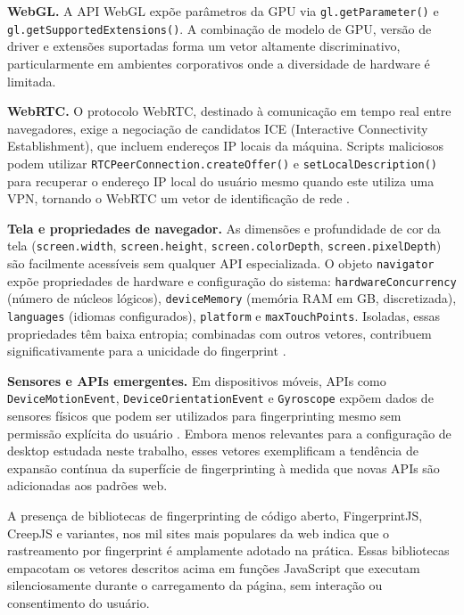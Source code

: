 \textbf{WebGL.} A API WebGL expõe parâmetros da GPU via
\texttt{gl.getParameter()} e \texttt{gl.getSupportedExtensions()}. A combinação de
modelo de GPU, versão de driver e extensões suportadas forma um vetor altamente
discriminativo, particularmente em ambientes corporativos onde a diversidade de
hardware é limitada.

\textbf{WebRTC.} O protocolo WebRTC, destinado à comunicação em tempo real entre
navegadores, exige a negociação de candidatos ICE (Interactive Connectivity
Establishment), que incluem endereços IP locais da máquina. Scripts maliciosos
podem utilizar \texttt{RTCPeerConnection.createOffer()} e
\texttt{setLocalDescription()} para recuperar o endereço IP local do usuário mesmo
quando este utiliza uma VPN, tornando o WebRTC um vetor de identificação de rede
\cite{reiter2017}.

\textbf{Tela e propriedades de navegador.} As dimensões e profundidade de cor da
tela (\texttt{screen.width}, \texttt{screen.height}, \texttt{screen.colorDepth},
\texttt{screen.pixelDepth}) são facilmente acessíveis sem qualquer API
especializada. O objeto \texttt{navigator} expõe propriedades de hardware e
configuração do sistema: \texttt{hardwareConcurrency} (número de núcleos lógicos),
\texttt{deviceMemory} (memória RAM em GB, discretizada), \texttt{languages}
(idiomas configurados), \texttt{platform} e \texttt{maxTouchPoints}. Isoladas,
essas propriedades têm baixa entropia; combinadas com outros vetores, contribuem
significativamente para a unicidade do fingerprint \cite{laperdrix2016}.

\textbf{Sensores e APIs emergentes.} Em dispositivos móveis, APIs como
\texttt{DeviceMotionEvent}, \texttt{DeviceOrientationEvent} e \texttt{Gyroscope}
expõem dados de sensores físicos que podem ser utilizados para
fingerprinting mesmo sem permissão explícita do usuário \cite{das2018}.
Embora menos relevantes para a configuração de desktop estudada neste
trabalho, esses vetores exemplificam a tendência de expansão contínua da superfície
de fingerprinting à medida que novas APIs são adicionadas aos padrões web.

A presença de bibliotecas de fingerprinting de código aberto, FingerprintJS, CreepJS e variantes, nos mil sites mais populares da web indica
que o rastreamento por fingerprint é amplamente adotado na prática. Essas
bibliotecas empacotam os vetores descritos acima em funções JavaScript que executam
silenciosamente durante o carregamento da página, sem interação ou consentimento do
usuário.

